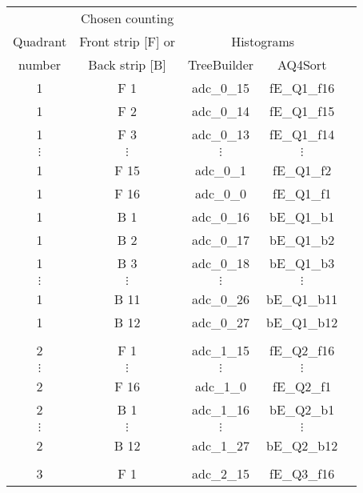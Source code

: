 \begin{tabular}{ccccc}
\hline
          & Chosen counting    &             &                  \\
Quadrant  & Front strip [F] or & \multicolumn{2}{c}{Histograms} \\
number    & Back strip [B]     & TreeBuilder & AQ4Sort          \\
\hline
1         & F 1                & adc\_0\_15  & fE\_Q1\_f16      \\
1         & F 2                & adc\_0\_14  & fE\_Q1\_f15      \\
1         & F 3                & adc\_0\_13  & fE\_Q1\_f14      \\
$\vdots$  & $\vdots$           & $\vdots$    & $\vdots$         \\
1         & F 15               & adc\_0\_1   & fE\_Q1\_f2       \\
1         & F 16               & adc\_0\_0   & fE\_Q1\_f1       \\
1         & B 1                & adc\_0\_16  & bE\_Q1\_b1       \\
1         & B 2                & adc\_0\_17  & bE\_Q1\_b2       \\
1         & B 3                & adc\_0\_18  & bE\_Q1\_b3       \\
$\vdots$  & $\vdots$           & $\vdots$    & $\vdots$         \\
1         & B 11               & adc\_0\_26  & bE\_Q1\_b11      \\
1         & B 12               & adc\_0\_27  & bE\_Q1\_b12      \\
          &                    &             &                  \\
2         & F 1                & adc\_1\_15  & fE\_Q2\_f16      \\
$\vdots$  & $\vdots$           & $\vdots$    & $\vdots$         \\
2         & F 16               & adc\_1\_0   & fE\_Q2\_f1       \\
2         & B 1                & adc\_1\_16  & bE\_Q2\_b1       \\
$\vdots$  & $\vdots$           & $\vdots$    & $\vdots$         \\
2         & B 12               & adc\_1\_27  & bE\_Q2\_b12      \\
          &                    &             &                  \\
3         & F 1                & adc\_2\_15  & fE\_Q3\_f16      \\

\end{tabular}
